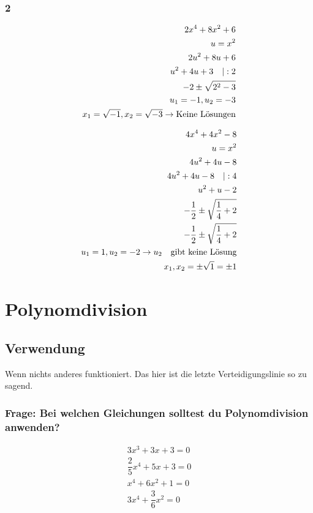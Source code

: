 \documentclass[11pt,a4paper]{article}
\begin{document}
\subsubsection*{2}

\begin{eqnarray}
2x^4 + 8x^2 + 6\\
u = x^2\\
2u^2 + 8u + 6\\
u^2 + 4u + 3 \quad \text{\textbar} : 2\\
-2 \pm \sqrt{2^2 -3}\\
u_1 = -1, u_2 = -3\\
x_1 = \sqrt{-1}, x_2 = \sqrt{-3} \rightarrow \text{Keine Lösungen}
\end{eqnarray}

\begin{eqnarray}
4x^4 + 4x^2 - 8\\
u = x^2\\
4u^2 + 4u - 8\\
4u^2 + 4u - 8 \quad \text{\textbar} : 4\\
u^2 + u - 2\\
-\dfrac{1}{2} \pm \sqrt{\dfrac{1}{4} + 2}\\
-\dfrac{1}{2} \pm \sqrt{\dfrac{1}{4} + 2}\\
u_1 = 1, u_2 = -2 \rightarrow u_2 \quad \text{gibt keine Lösung}\\
x_1, x_2 = \pm \sqrt{1} = \pm 1
\end{eqnarray}

\newpage

\section{Polynomdivision}

\subsection{Verwendung}
Wenn nichts anderes funktioniert. Das hier ist die letzte Verteidigungslinie so zu sagend.

\subsubsection*{Frage: Bei welchen Gleichungen solltest du Polynomdivision anwenden?}
\begin{eqnarray}
3x^3 + 3x + 3 = 0\\
\dfrac{2}{5} x^4 + 5x + 3 = 0\\
x^4 + 6x^2 + 1 = 0\\
3x^4 + \dfrac{3}{6} x^2 = 0
\end{eqnarray}
\end{document}
